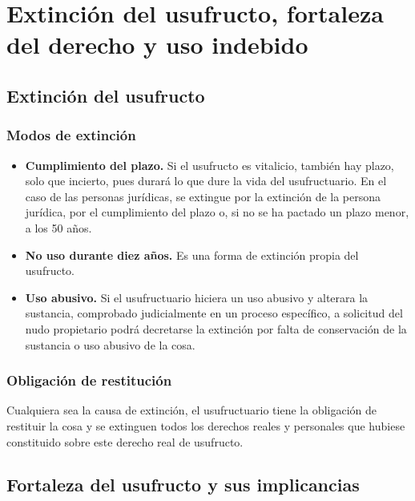 \documentclass[12pt,oneside]{book}
\begin{document}
\chapter[Extinción, fortaleza y uso indebido]{Extinción del usufructo, fortaleza del derecho y uso indebido}

\section{Extinción del usufructo}

\subsection{Modos de extinción}

\begin{itemize}
    \item \textbf{Cumplimiento del plazo.} Si el usufructo es vitalicio, también hay plazo, solo que incierto, pues durará lo que dure la vida del usufructuario. En el caso de las personas jurídicas, se extingue por la extinción de la persona jurídica, por el cumplimiento del plazo o, si no se ha pactado un plazo menor, a los 50 años.
    \item \textbf{No uso durante diez años.} Es una forma de extinción propia del usufructo.
    \item \textbf{Uso abusivo.} Si el usufructuario hiciera un uso abusivo y alterara la sustancia, comprobado judicialmente en un proceso específico, a solicitud del nudo propietario podrá decretarse la extinción por falta de conservación de la sustancia o uso abusivo de la cosa.
\end{itemize}

\subsection{Obligación de restitución}

Cualquiera sea la causa de extinción, el usufructuario tiene la obligación de restituir la cosa y se extinguen todos los derechos reales y personales que hubiese constituido sobre este derecho real de usufructo.

\section{Fortaleza del usufructo y sus implicancias}
\end{document}
